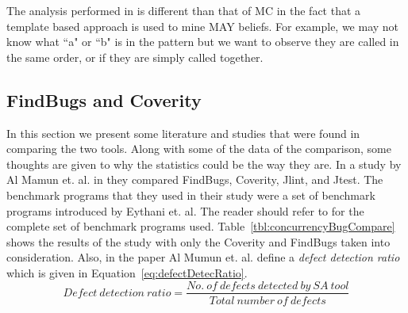 \documentclass[10pt,oneside]{IEEEtran}
\begin{document}
The analysis performed in \cite{7} is different than that of MC in the fact that a template based approach is used to mine MAY beliefs. For example, we may not know what ``a" or ``b" is in the pattern but we want to observe they are called in the same order, or if they are simply called together.


\subsection{FindBugs and Coverity}
In this section we present some literature and studies that were found in comparing the two tools. Along with some of the data of the comparison, some thoughts are given to why the statistics could be the way they are. In a study by Al Mamun et. al. in \cite{11} they compared FindBugs, Coverity, Jlint, and Jtest. The benchmark programs that they used in their study were a set of benchmark programs introduced by Eythani et. al. The reader should refer to \cite{11} for the complete set of benchmark programs used. Table~\ref{tbl:concurrencyBugCompare} shows the results of the study with only the Coverity and FindBugs taken into consideration. Also, in the paper Al Mumun et. al. define a \textit{defect detection ratio} which is given in Equation~\ref{eq:defectDetecRatio}.
\small
\begin{equation}
  \label{eq:defectDetecRatio}
  Defect\ detection\ ratio = \frac{No.\ of\ defects\ detected\ by\ SA\ tool}{Total\ number\ of\ defects}
\end{equation}
\normalsize
\end{document}
